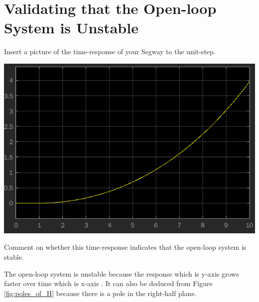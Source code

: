 \section{Validating that the Open-loop System is Unstable}

\begin{questions}
\setcounter{question}{\value{lastquestioncounter}}

\question[2E]
Insert a picture of the time-response of your Segway to the unit-step.

\begin{solution}
   \begin{minipage}[htbp]{\linewidth}
      \centering
      \includegraphics[scale=0.75]{figures/open_loop_time_response.png}
   \end{minipage}
\end{solution}

\question[1M]
Comment on whether this time-response indicates that the open-loop system is stable.

\begin{solution}
   The open-loop system is unstable because the response which is y-axis grows faster over time which is x-axis \cite{ref:lecture5}. It can also be deduced from Figure \ref{fig:poles_of_H} because there is a pole in the right-half plane.
\end{solution}

\setcounter{lastquestioncounter}{\value{question}}
\end{questions}
